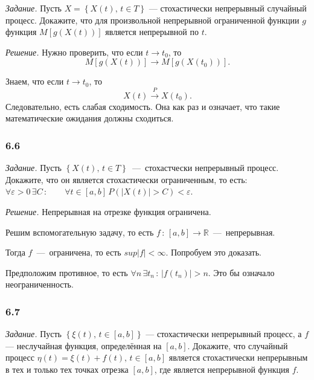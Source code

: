 \textit{Задание.}
Пусть $X = \left\{ X \left( t \right), \, t \in T \right\} $ ---
стохастически непрерывный случайный процесс.
Докажите, что для произвольной непрерывной ограниченной функции $g$ функция
$M \left[ g \left( X \left( t \right) \right) \right] $ является непрерывной по $t$.

\textit{Решение.}
Нужно проверить, что если $t \to t_0$, то
$$M \left[ g \left( X \left( t \right) \right) \right] \to
  M \left[ g \left( X \left( t_0 \right) \right) \right].$$

Знаем, что если $t \to t_0$, то
$$X \left( t \right) \overset{P}{ \to }
  X \left( t_0 \right).$$
Следовательно, есть слабая сходимость.
Она как раз и означает, что такие математические ожидания должны сходиться.

\subsubsection*{6.6}

\textit{Задание.}
Пусть $ \left\{ X \left( t \right), \, t \in T \right\} $~---~стохастчески непрерывный процесс.
Докажите, что он является стохастически ограниченным, то есть:
$ \forall \varepsilon > 0 \, \exists C \, : \qquad \forall t \in \left[ a, b \right] \,
  P \left( \left| X \left( t \right) \right| > C \right) < \varepsilon $.

\textit{Решение.}
Непрерывная на отрезке функция ограничена.

Решим вспомогательную задачу,
то есть $f \, : \, \left[ a, b \right] \to \mathbb{R}$~---~непрерывная.

Тогда $f$~---~ограничена, то есть $sup \left| f \right| < \infty $.
Попробуем это доказать.

Предположим противное,
то есть $ \forall n \, \exists t_n \, : \, \left| f \left( t_n \right) \right| > n$.
Это бы означало неограниченность.

\subsubsection*{6.7}

\textit{Задание.}
Пусть $ \left\{ \xi \left( t \right), \, t \in \left[ a, b \right] \right\} $ ---
стохастически непрерывный процесс, а $f$ --- неслучайная функция,
определённая на $ \left[ a, b \right] $.
Докажите, что случайный процесс
$ \eta \left( t \right) =
  \xi \left( t \right) + f \left( t \right), \, t \in \left[ a, b \right] $
является стохастически непрерывным в тех и только тех точках отрезка $ \left[ a, b \right] $,
где является непрерывной функция $f$.

